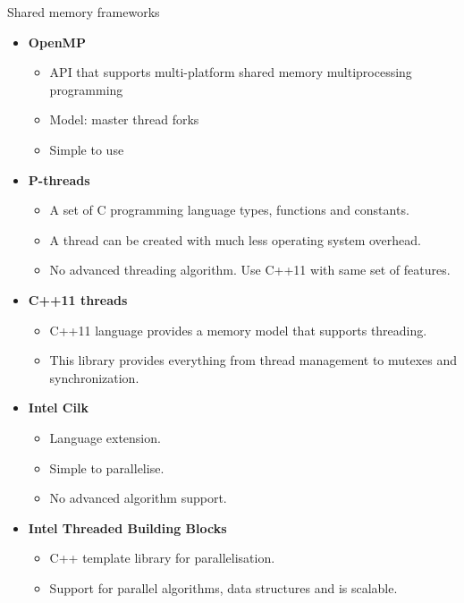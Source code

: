 \documentclass[10pt,times]{beamer}
\begin{document}
\begin{frame}{Shared memory frameworks}
\begin{itemize}
\item \textbf{OpenMP}
\begin{itemize}
\item API that supports multi-platform shared memory multiprocessing programming
\item Model: master thread forks 
\item Simple to use
\end{itemize}

\item \textbf{P-threads}
\begin{itemize}
\item A set of C programming language types, functions and constants. 
\item A thread can be created with much less operating system overhead.
\item No advanced threading algorithm. Use C++11 with same set of features.
\end{itemize}

\item \textbf{C++11 threads}
\begin{itemize}
\item C++11 language provides a memory model that supports threading.
\item This library provides everything from thread management to mutexes and 
synchronization. 
\end{itemize}

\item \textbf{Intel Cilk}
\begin{itemize}
\item Language extension.
\item Simple to parallelise.
\item No advanced algorithm support.
\end{itemize}

\item \textbf{Intel Threaded Building Blocks}
\begin{itemize}
\item C++ template library for parallelisation.
\item Support for parallel algorithms, data structures and is scalable.
\end{itemize}
\end{itemize}

\end{frame}
\end{document}
